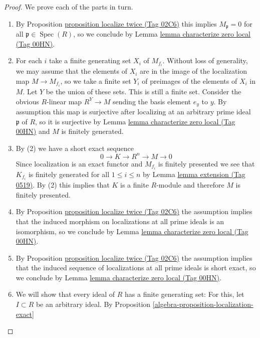 \documentclass{amsart}
\theoremstyle{plain}
\theoremstyle{definition}
\theoremstyle{remark}
\numberwithin{equation}{subsection}
\def\Spec{\mathop{\mathrm{Spec}}}
\begin{document}
\begin{proof}
We prove each of the parts in turn.
\begin{enumerate}
\item By Proposition \href{https://stacks.math.columbia.edu/tag/02C6}{proposition localize twice (Tag 02C6)}
this implies $M_\mathfrak p = 0$ for all $\mathfrak p \in \Spec(R)$,
so we conclude by Lemma \href{https://stacks.math.columbia.edu/tag/00HN}{lemma characterize zero local (Tag 00HN)}.
\item For each $i$ take a finite generating set $X_i$ of $M_{f_i}$.
Without loss of generality, we may assume that the elements of $X_i$ are
in the image of the localization map $M \rightarrow M_{f_i}$, so we take
a finite set $Y_i$ of preimages of the elements of $X_i$ in $M$. Let $Y$
be the union of these sets. This is still a finite set.
Consider the obvious $R$-linear map $R^Y \rightarrow M$ sending the basis
element $e_y$ to $y$. By assumption this map is surjective after localizing
at an arbitrary prime ideal $\mathfrak p$ of $R$, so it is surjective by
Lemma \href{https://stacks.math.columbia.edu/tag/00HN}{lemma characterize zero local (Tag 00HN)}
and $M$ is finitely generated.
\item By (2) we have a short exact sequence
$$
0 \rightarrow K \rightarrow R^n \rightarrow M \rightarrow 0
$$
Since localization is an exact functor and $M_{f_i}$ is finitely
presented we see that $K_{f_i}$ is finitely generated for all
$1 \leq i \leq n$ by Lemma \href{https://stacks.math.columbia.edu/tag/0519}{lemma extension (Tag 0519)}.
By (2) this implies that $K$ is a finite $R$-module and therefore
$M$ is finitely presented.
\item By Proposition \href{https://stacks.math.columbia.edu/tag/02C6}{proposition localize twice (Tag 02C6)}
the assumption implies that the induced morphism
on localizations at all prime ideals is an isomorphism, so we conclude
by Lemma \href{https://stacks.math.columbia.edu/tag/00HN}{lemma characterize zero local (Tag 00HN)}.
\item By Proposition \href{https://stacks.math.columbia.edu/tag/02C6}{proposition localize twice (Tag 02C6)} the assumption
implies that the induced
sequence of localizations at all prime ideals is short exact, so we
conclude by Lemma \href{https://stacks.math.columbia.edu/tag/00HN}{lemma characterize zero local (Tag 00HN)}.
\item We will show that every ideal of $R$ has a finite generating set:
For this, let $I \subset R$ be an arbitrary ideal. By
Proposition \ref{algebra-proposition-localization-exact}

\end{enumerate}
\end{proof}
\end{document}
